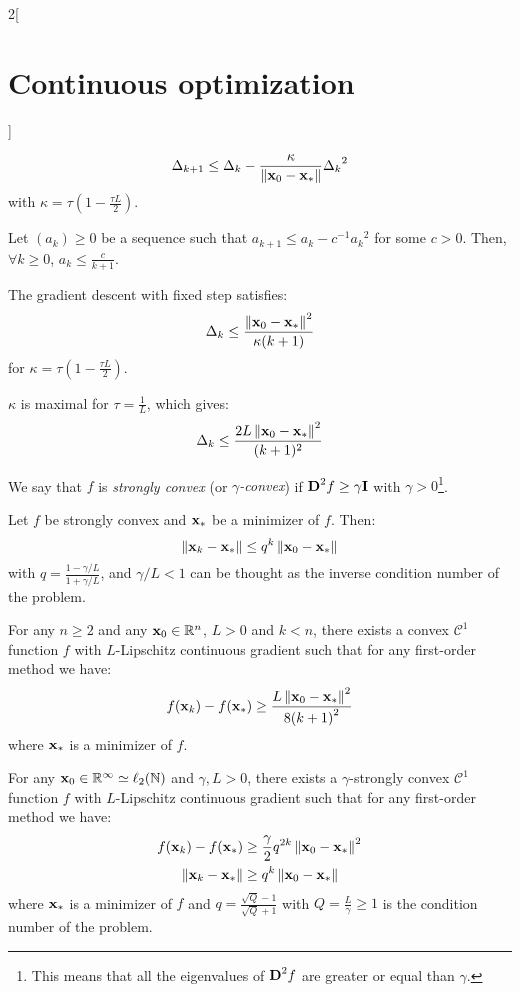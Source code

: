 \documentclass[../../../main_math.tex]{subfiles}
\begin{document}
\begin{multicols}{2}[\section{Continuous optimization}]
\begin{proposition}
    $$
      \Delta_{k+1}\leq \Delta_k-\frac{\kappa}{\left\|\boldsymbol{\mathrm{x}}_0-\boldsymbol{\mathrm{x}}_*\right\|} {\Delta_k}^2
    $$
    with $\kappa=\tau\left( 1-\frac{\tau L}{2} \right)$.
  \end{proposition}
  \begin{lemma}
    Let $(a_k)\geq 0$ be a sequence such that $a_{k+1}\leq a_k-c^{-1}{a_k}^2$ for some $c>0$. Then, $\forall k\geq 0$, $a_k\leq \frac{c}{k+1}$.
  \end{lemma}
  \begin{theorem}
    The gradient descent with fixed step satisfies:
    $$
      \Delta_k\leq \frac{\left\|\boldsymbol{\mathrm{x}}_0-\boldsymbol{\mathrm{x}}_*\right\|^2}{\kappa (k+1)}
    $$
    for $\kappa=\tau\left( 1-\frac{\tau L}{2} \right)$.
  \end{theorem}
  \begin{remark}
    $\kappa$ is maximal for $\tau=\frac{1}{L}$, which gives:
    $$
      \Delta_k\leq \frac{2L\left\|\boldsymbol{\mathrm{x}}_0-\boldsymbol{\mathrm{x}}_*\right\|^2}{(k+1)^2}
    $$
  \end{remark}
  \begin{definition}
    We say that $f$ is \emph{strongly convex} (or \emph{$\gamma$-convex}) if $\boldsymbol{\mathrm{D}}^2f\geq \gamma \boldsymbol{\mathrm{I}}$ with $\gamma>0$\footnote{This means that all the eigenvalues of $\boldsymbol{\mathrm{D}}^2f$ are greater or equal than $\gamma$.}.
  \end{definition}
  \begin{proposition}
    Let $f$ be strongly convex and $\boldsymbol{\mathrm{x}}_*$ be a minimizer of $f$. Then:
    $$
      \left\|\boldsymbol{\mathrm{x}}_k-\boldsymbol{\mathrm{x}}_*\right\|\leq q^k \left\|\boldsymbol{\mathrm{x}}_0-\boldsymbol{\mathrm{x}}_*\right\|
    $$
    with $q=\frac{1-\gamma/L}{1+\gamma/L}$, and $\gamma/L<1$ can be thought as the inverse condition number of the problem.
  \end{proposition}
  \begin{theorem}
    For any $n\geq 2$ and any $\boldsymbol{\mathrm{x}}_0\in\mathbb{R}^n$, $L>0$ and $k<n$, there exists a convex $\mathcal{C}^1$ function $f$ with $L$-Lipschitz continuous gradient such that for any first-order method we have:
    $$
      f(\boldsymbol{\mathrm{x}}_k)-f(\boldsymbol{\mathrm{x}}_*)\geq \frac{L\left\|\boldsymbol{\mathrm{x}}_0-\boldsymbol{\mathrm{x}}_*\right\|^2}{8{(k+1)}^2}
    $$
    where $\boldsymbol{\mathrm{x}}_*$ is a minimizer of $f$.
  \end{theorem}
  \begin{theorem}
    For any $\boldsymbol{\mathrm{x}}_0\in\mathbb{R}^\infty\simeq \ell_2(\mathbb{N})$ and $\gamma,L>0$, there exists a $\gamma$-strongly convex $\mathcal{C}^1$ function $f$ with $L$-Lipschitz continuous gradient such that for any first-order method we have:
    \begin{align*}
      f(\boldsymbol{\mathrm{x}}_k)-f(\boldsymbol{\mathrm{x}}_*)  & \geq \frac{\gamma}{2}q^{2k}\left\|\boldsymbol{\mathrm{x}}_0-\boldsymbol{\mathrm{x}}_*\right\|^2 \\
      \left\|\boldsymbol{\mathrm{x}}_k-\boldsymbol{\mathrm{x}}_*\right\| & \geq q^k \left\|\boldsymbol{\mathrm{x}}_0-\boldsymbol{\mathrm{x}}_*\right\|
    \end{align*}
    where $\boldsymbol{\mathrm{x}}_*$ is a minimizer of $f$ and $q=\frac{\sqrt{Q}-1}{\sqrt{Q}+1}$ with $Q=\frac{L}{\gamma}\geq 1$ is the condition number of the problem.
  \end{theorem}

\end{multicols}
\end{document}
